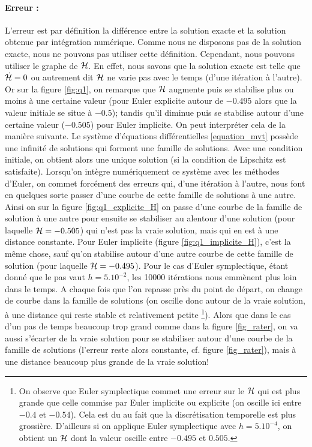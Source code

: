 \paragraph{Erreur : }
L'erreur est par définition la différence entre la solution exacte et la solution obtenue par intégration numérique. Comme nous ne disposons pas de la solution exacte, nous ne pouvons pas utiliser cette définition. Cependant, nous pouvons utiliser le graphe de $\mathcal{H}$. 
En effet, nous savons que la solution exacte est telle que $\dot{\mathcal{H}} = 0$ ou autrement dit $\mathcal{H}$ ne varie pas avec le temps (d'une itération à l'autre). Or sur la figure \ref{fig:q1}, on remarque que $\mathcal{H}$ augmente puis se stabilise plus ou moins à une certaine valeur (pour Euler explicite autour de $-0.495$ alors que la valeur initiale se situe à $-0.5$); tandis qu'il diminue puis se stabilise autour d'une certaine valeur ($-0.505$) pour Euler implicite. 
On peut interpréter cela de la manière suivante. Le système d'équations différentielles \ref{equation_mvt} possède une infinité de solutions qui forment une famille de solutions. Avec une condition initiale, on obtient alors une unique solution (si la condition de Lipschitz est satisfaite). 
Lorsqu'on intègre numériquement ce système avec les méthodes d'Euler, on commet forcément des erreurs qui, d'une itération à l'autre, nous font en quelques sorte passer d'une courbe de cette famille de solutions à une autre. 
Ainsi on sur la figure \ref{fig:q1_explicite_H} on passe d'une courbe de la famille de solution à une autre pour ensuite se stabiliser au alentour d'une solution (pour laquelle $\mathcal{H}=-0.505$) qui n'est pas la vraie solution, mais qui en est à une distance constante. Pour Euler implicite (figure \ref{fig:q1_implicite_H}), c'est la même chose, sauf qu'on stabilise autour d'une autre courbe de cette famille de solution (pour laquelle $\mathcal{H} = -0.495$). 
Pour le cas d'Euler symplectique, étant donné que le pas vaut $h=5.10^{-2}$, les 10000 itérations nous emmènent plus loin dans le temps. A chaque fois que l'on repasse près du point de départ, on change de courbe dans la famille de solutions (on oscille donc autour de la vraie solution, à une distance qui reste stable et relativement petite \footnote{On observe que Euler symplectique commet une erreur sur le $\mathcal{H}$ qui est plus grande que celle commise par Euler implicite ou explicite (on oscille ici entre $-0.4$ et $-0.54$). Cela est du au fait que la discrétisation temporelle est plus grossière. D'ailleurs si on applique Euler symplectique avec $h=5.10^{-4}$, on obtient un $\mathcal{H}$ dont la valeur oscille entre $-0.495$ et $0.505$.}). Alors que dans le cas d'un pas de temps beaucoup trop grand comme dans la figure \ref{fig_rater}, on va aussi s'écarter de la vraie solution pour se stabiliser autour d'une courbe de la famille de solutions (l'erreur reste alors constante, cf. figure \ref{fig_rater}), mais à une distance beaucoup plus grande de la vraie solution!



